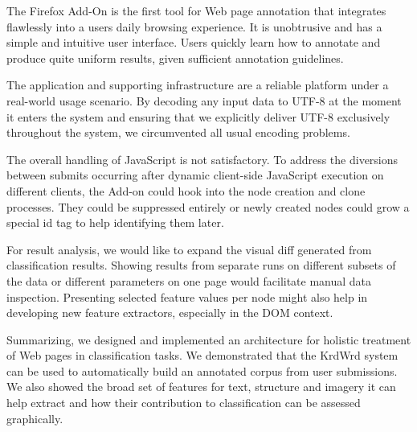 The {\KrdWrd} Firefox Add-On is the first tool for Web page annotation that integrates flawlessly into a users daily browsing experience.
It is unobtrusive and has a simple and intuitive user interface.
Users quickly learn how to annotate and produce quite uniform results, given sufficient annotation guidelines.

The {\KrdWrd} application and supporting infrastructure are a reliable platform under a real-world usage scenario.
By decoding any input data to UTF-8 at the moment it enters the system and ensuring that we explicitly deliver UTF-8 exclusively throughout the system, we circumvented all usual encoding problems.


The overall handling of JavaScript is not satisfactory.
To address the diversions between submits occurring after dynamic client-side JavaScript execution on different clients, the Add-on could hook into the node creation and clone processes.
They could be suppressed entirely or newly created nodes could grow a special id tag to help identifying them later.

For result analysis, we would like to expand the visual diff generated from classification results.
Showing results from separate runs on different subsets of the data or different parameters on one page would facilitate manual data inspection.
Presenting selected feature values per node might also help in developing new feature extractors, especially in the DOM context.


Summarizing, we designed and implemented an architecture for holistic treatment of Web pages in classification tasks.
We demonstrated that the KrdWrd system can be used to automatically build an annotated corpus from user submissions.
We also showed the broad set of features for text, structure and imagery it can help extract and how their contribution to classification can be assessed graphically.

\review{

}

